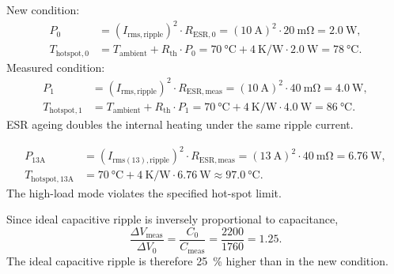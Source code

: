 
\begin{solutionblock}
    New condition:
    \begin{align}
        P_0&=(I_\mathrm{rms,ripple})^2 \cdot R_\mathrm{ESR,0}=(\SI{10}{\ampere})^2\cdot\SI{20}{\milli\ohm}
        =\SI{2.0}{\watt},\\
        T_\mathrm{hotspot,0}&=T_\mathrm{ambient} + R_\mathrm{th} \cdot P_0 =\SI{70}{\degreeCelsius}
        +\SI{4}{\kelvin\per\watt}\cdot\SI{2.0}{\watt}
        =\SI{78}{\degreeCelsius}.
    \end{align}
    Measured condition:
    \begin{align}
        P_1&=(I_\mathrm{rms,ripple})^2 \cdot R_\mathrm{ESR,meas}=(\SI{10}{\ampere})^2\cdot\SI{40}{\milli\ohm}
        =\SI{4.0}{\watt},\\
        T_\mathrm{hotspot,1}&=T_\mathrm{ambient} + R_\mathrm{th} \cdot P_1 = \SI{70}{\degreeCelsius}
        +\SI{4}{\kelvin\per\watt}\cdot\SI{4.0}{\watt}
        =\SI{86}{\degreeCelsius}.
    \end{align}
    ESR ageing doubles the internal heating under the same ripple current.
\end{solutionblock}


\begin{solutionblock}
    \begin{align}
        P_{13\mathrm{A}}&=(I_\mathrm{rms(13),ripple})^2 \cdot R_\mathrm{ESR,meas}=(\SI{13}{\ampere})^2\cdot\SI{40}{\milli\ohm}
        =\SI{6.76}{\watt},\\
        T_\mathrm{hotspot,13\mathrm{A}}&=\SI{70}{\degreeCelsius}
        +\SI{4}{\kelvin\per\watt}\cdot\SI{6.76}{\watt}
        \approx\SI{97.0}{\degreeCelsius}.
    \end{align}
    The high-load mode violates the specified hot-spot limit.
\end{solutionblock}


\begin{solutionblock}
    Since ideal capacitive ripple is inversely proportional to capacitance,
    \begin{equation}
        \frac{\Delta V_\mathrm{meas}}{\Delta V_0}
        =\frac{C_0}{C_\mathrm{meas}}
        =\frac{2200}{1760}=1.25.
    \end{equation}
    The ideal capacitive ripple is therefore \SI{25}{\percent} higher than in the
    new condition.
\end{solutionblock}

